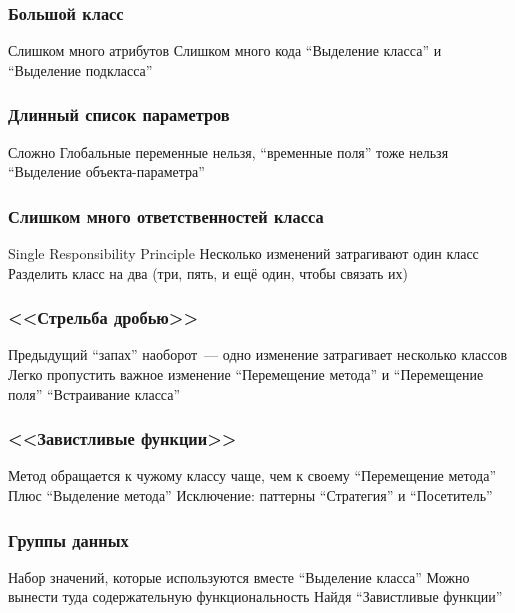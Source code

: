 \documentclass{../../slides-style}
\begin{document}
    \begin{frame}
        \frametitle{Большой класс}
        \begin{outline}
            \1 Слишком много атрибутов
            \1 Слишком много кода
            \1 ``Выделение класса'' и ``Выделение подкласса''
        \end{outline}
    \end{frame}

    \begin{frame}
        \frametitle{Длинный список параметров}
        \begin{outline}
            \1 Сложно
            \1 Глобальные переменные нельзя, ``временные поля'' тоже нельзя
            \1 ``Выделение объекта-параметра''
        \end{outline}
    \end{frame}

    \begin{frame}
        \frametitle{Слишком много ответственностей класса}
        \begin{outline}
            \1 Single Responsibility Principle
            \1 Несколько изменений затрагивают один класс
            \1 Разделить класс на два (три, пять, и ещё один, чтобы связать их)
        \end{outline}
    \end{frame}

    \begin{frame}
        \frametitle{<<Стрельба дробью>>}
        \begin{outline}
            \1 Предыдущий ``запах'' наоборот~--- одно изменение затрагивает несколько классов
                \2 Легко пропустить важное изменение
            \1 ``Перемещение метода'' и ``Перемещение поля''
            \1 ``Встраивание класса''
        \end{outline}
    \end{frame}

    \begin{frame}
        \frametitle{<<Завистливые функции>>}
        \begin{outline}
            \1 Метод обращается к чужому классу чаще, чем к своему
            \1 ``Перемещение метода''
                \2 Плюс ``Выделение метода''
            \1 Исключение: паттерны ``Стратегия'' и ``Посетитель''
        \end{outline}
    \end{frame}

    \begin{frame}
        \frametitle{Группы данных}
        \begin{outline}
            \1 Набор значений, которые используются вместе
            \1 ``Выделение класса''
                \2 Можно вынести туда содержательную функциональность
                    \3 Найдя ``Завистливые функции''
        \end{outline}
    \end{frame}
\end{document}
